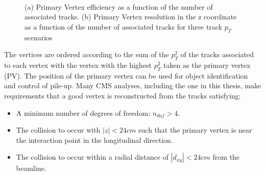 \begin{figure}[hbt]
  \begin{center} 
   ~
   \caption{(a) Primary Vertex efficiency as a function of the number of associated tracks. (b) Primary Vertex 
   resolution in the z coordinate as a function of the number of associated tracks for three track $p_T$ scenarios \cite{tracker_seven}
   \label{fig:pvEffRes} }
  \end{center}
\end{figure}

The vertices are ordered according to the sum of the $p_T^2$ of the tracks associated to each vertex with the 
vertex with the highest $p_T^2$ taken as the primary vertex (PV). The position of the primary vertex can
be used for object identification and control of pile-up. Many CMS analyses, including the one in this 
thesis, make requirements that a good vertex is reconstructed from the tracks satisfying:

\begin{itemize}
\item A minimum number of degrees of freedom: $n_{dof} > 4$.
\item The collision to occur with $|z| < 24cm$ such that the primary vertex is near the interaction point in the longitudinal direction.
\item The collision to occur within a radial distance of $|d_{xy}| < 24cm$ from the beamline.
\end{itemize}


